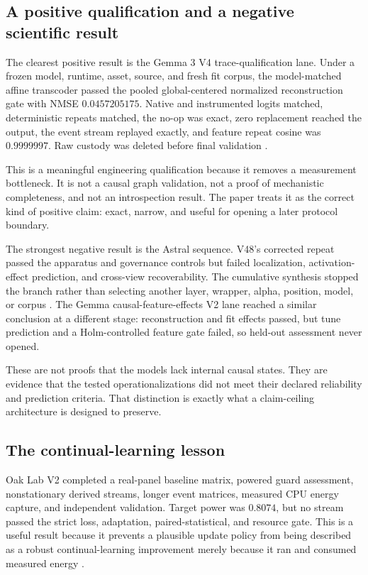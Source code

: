 \documentclass[11pt,twoside]{article}
\newcommand{\sourcecite}[1]{\parencite{#1}}
\begin{document}
\subsection{A positive qualification and a negative scientific result}

  The clearest positive result is the Gemma 3 V4 trace-qualification lane. Under a frozen model, runtime, asset, source, and fresh fit corpus, the model-matched affine transcoder passed the pooled global-centered normalized reconstruction gate with NMSE $0.0457205175$. Native and instrumented logits matched, deterministic repeats matched, the no-op was exact, zero replacement reached the output, the event stream replayed exactly, and feature repeat cosine was $0.9999997$. Raw custody was deleted before final validation \sourcecite{repoAstralV42026}.

  This is a meaningful engineering qualification because it removes a measurement bottleneck. It is not a causal graph validation, not a proof of mechanistic completeness, and not an introspection result. The paper treats it as the correct kind of positive claim: exact, narrow, and useful for opening a later protocol boundary.

  The strongest negative result is the Astral sequence. V48's corrected repeat passed the apparatus and governance controls but failed localization, activation-effect prediction, and cross-view recoverability. The cumulative synthesis stopped the branch rather than selecting another layer, wrapper, alpha, position, model, or corpus \sourcecite{repoAstralV482026}. The Gemma causal-feature-effects V2 lane reached a similar conclusion at a different stage: reconstruction and fit effects passed, but tune prediction and a Holm-controlled feature gate failed, so held-out assessment never opened.

  These are not proofs that the models lack internal causal states. They are evidence that the tested operationalizations did not meet their declared reliability and prediction criteria. That distinction is exactly what a claim-ceiling architecture is designed to preserve.

\subsection{The continual-learning lesson}

  Oak Lab V2 completed a real-panel baseline matrix, powered guard assessment, nonstationary derived streams, longer event matrices, measured CPU energy capture, and independent validation. Target power was $0.8074$, but no stream passed the strict loss, adaptation, paired-statistical, and resource gate. This is a useful result because it prevents a plausible update policy from being described as a robust continual-learning improvement merely because it ran and consumed measured energy \sourcecite{repoOakLab2026}.
\end{document}
